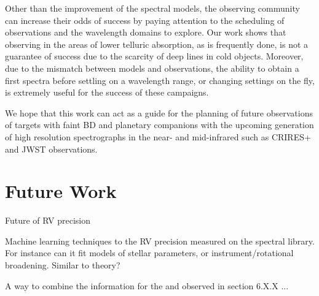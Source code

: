 Other than the improvement of the spectral models, the observing community can increase their odds of success by paying attention to the scheduling of observations and the wavelength domains to explore.
Our work shows that observing in the areas of lower telluric absorption, as is frequently done, is not a guarantee of success due to the scarcity of deep lines in cold objects.
Moreover, due to the mismatch between models and observations, the ability to obtain a first spectra before settling on a wavelength range, or changing settings on the fly, is extremely useful for the success of these campaigns.

We hope that this work can act as a guide for the planning of future observations of targets with faint BD and planetary companions with the upcoming generation of high resolution spectrographs in the near- and mid-infrared such as {CRIRES+} and JWST observations.





\section{Future Work}

Future of {RV} precision

Machine learning techniques to the RV precision measured on the spectral library.
For instance can it fit models of stellar parameters, or instrument/rotational broadening.
Similar to theory?


A way to combine the information for the \logg{} and \feh{} observed in section 6.X.X ...

